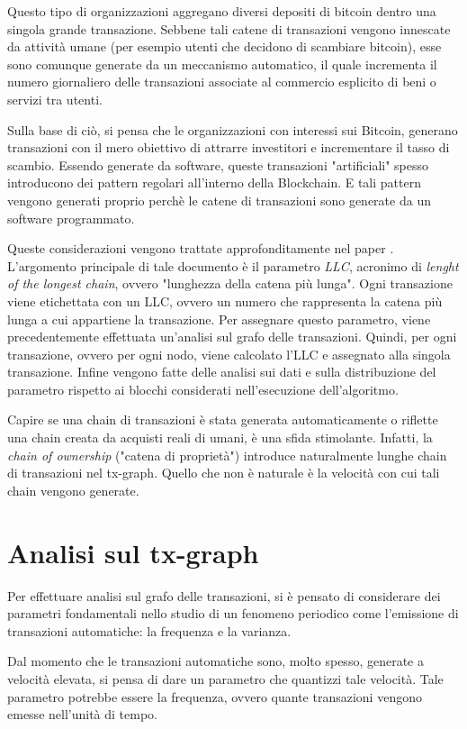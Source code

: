 Questo tipo di organizzazioni aggregano diversi depositi di bitcoin dentro una singola grande transazione.  Sebbene tali catene di transazioni vengono innescate da attività umane (per esempio utenti che decidono di scambiare bitcoin), esse sono comunque generate da un meccanismo automatico, il quale incrementa il numero giornaliero delle transazioni associate al commercio esplicito di beni o servizi tra utenti.

Sulla base di ciò, si pensa che le organizzazioni con interessi sui Bitcoin, generano transazioni con il mero obiettivo di attrarre investitori e incrementare il tasso di scambio. Essendo generate da software, queste transazioni "artificiali" spesso introducono dei pattern regolari all'interno della Blockchain. E tali pattern vengono generati proprio perchè le catene di transazioni sono generate da un software programmato. 

Queste considerazioni vengono trattate approfonditamente nel paper \cite{ddp-ltcbh-17}. L'argomento principale di tale documento è il parametro \textit{LLC}, acronimo di \textit{lenght of the longest chain}, ovvero "lunghezza della catena più lunga". Ogni transazione viene etichettata con un LLC, ovvero un numero che rappresenta la catena più lunga a cui appartiene la transazione. Per assegnare questo parametro, viene precedentemente effettuata un'analisi sul grafo delle transazioni. Quindi, per ogni transazione, ovvero per ogni nodo, viene calcolato l'LLC e assegnato alla singola transazione. Infine vengono fatte delle analisi sui dati e sulla distribuzione del parametro rispetto ai blocchi considerati nell'esecuzione dell'algoritmo.

Capire se una chain di transazioni è stata generata automaticamente o riflette una chain creata da acquisti reali di umani, è una sfida stimolante. Infatti, la \textit{chain of ownership} ("catena di proprietà") introduce naturalmente lunghe chain di transazioni nel tx-graph. Quello che non è naturale è la velocità con cui tali chain vengono generate. 

\section{Analisi sul tx-graph}
 
Per effettuare analisi sul grafo delle transazioni, si è pensato di considerare dei parametri fondamentali nello studio di un fenomeno periodico come l'emissione di transazioni automatiche: la frequenza e la varianza.

Dal momento che le transazioni automatiche sono, molto spesso, generate a velocità elevata, si pensa di dare un parametro che quantizzi tale velocità. Tale parametro potrebbe essere la frequenza, ovvero quante transazioni vengono emesse nell'unità di tempo. 

